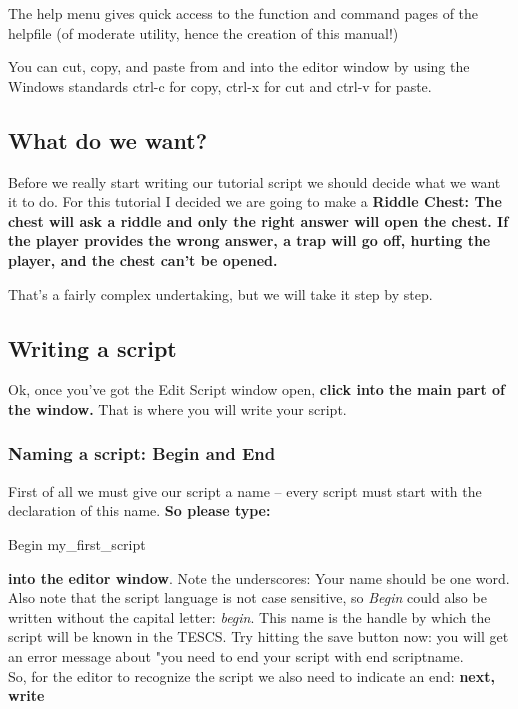 \documentclass[
]{article}
\begin{document}
The help menu gives quick access to the function and command pages of
the helpfile (of moderate utility, hence the creation of this manual!)

You can cut, copy, and paste from and into the editor window by using
the Windows standards ctrl-c for copy, ctrl-x for cut and ctrl-v for
paste.

\hypertarget{what-do-we-want}{%
\subsection{What do we want?}\label{what-do-we-want}}

Before we really start writing our tutorial script we should decide what
we want it to do. For this tutorial I decided we are going to make a
\textbf{Riddle Chest: The chest will ask a riddle and only the right
answer will open the chest. If the player provides the wrong answer, a
trap will go off, hurting the player, and the chest can't be opened.}

That's a fairly complex undertaking, but we will take it step by step.

\hypertarget{writing-a-script}{%
\subsection{Writing a script}\label{writing-a-script}}

Ok, once you've got the Edit Script window open, \textbf{click into the
main part of the window.} That is where you will write your script.

\hypertarget{naming-a-script-begin-and-end}{%
\subsubsection{Naming a script: Begin and
End}\label{naming-a-script-begin-and-end}}

First of all we must give our script a name -- every script must start
with the declaration of this name. \textbf{So please type:}

Begin my\_first\_script

\textbf{into the editor window}. Note the underscores: Your name should
be one word. Also note that the script language is not case sensitive,
so \emph{Begin} could also be written without the capital letter:
\emph{begin}. This name is the handle by which the script will be known
in the TESCS. Try hitting the save button now: you will get an error
message about "you need to end your script with end scriptname.\\
So, for the editor to recognize the script we also need to indicate an
end: \textbf{next, write}
\end{document}
